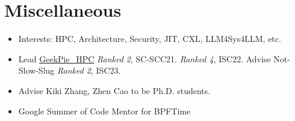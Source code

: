 \documentclass{resume}
\newcommand{\en}[1]{#1}
\newcommand{\zh}[1]{}
\begin{document}
\section{\en{Miscellaneous}\zh{其他}}
\begin{itemize}
      \item \en{Interests: HPC, Architecture, Security, JIT, CXL, LLM4Sys4LLM, etc.}
            \zh{兴趣：高性能计算、体系结构、安全、JIT、CXL、LLM4Sys4LLM等。}
      \item \en{Lead \href{https://hpc.geekpie.club}{GeekPie\_HPC} \textit{Ranked 2}, SC-SCC21. \textit{Ranked 4}, ISC22. Advise Not-Slow-Slug \textit{Ranked 2}, ISC23.} \zh{带领\href{https://hpc.geekpie.club}{GeekPie\_HPC} SCC21 团队第2名，ISC22 团队第4名，指导 Not-Slow-Slug 团队 ISC23 团队第2名。}
      \item \en{Advise Kiki Zhang, Zhen Cao to be Ph.D. students.}\zh{指导 Kiki Zhang, Zhen Cao 成为博士生。}
      \item \en{Google Summer of Code Mentor for BPFTime}
            \zh{谷歌编程之夏 BPFTime 指导}
\end{itemize}
\end{document}
